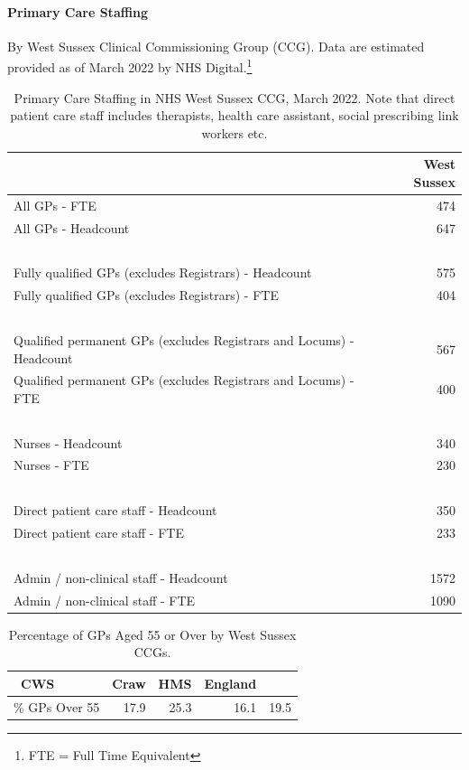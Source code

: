 \paragraph{Primary Care Staffing} By West Sussex Clinical Commissioning Group (CCG). Data are estimated provided as of March 2022 by NHS Digital.\footnote{FTE = Full Time Equivalent}
\begin{table}[hbt]
    \caption[Primary Care Staffing in NHS West Sussex CCG, March 2022.]{Primary Care Staffing in NHS West Sussex CCG, March 2022. Note that direct patient care staff includes therapists, health care assistant, social prescribing link workers etc.}
    \centering
    \begin{tabular}{lr}
    \toprule
    \ & West Sussex \\
    \midrule
    All GPs - FTE & 474 \\
    All GPs - Headcount & 647  \\
    \ & \ \\
    Fully qualified GPs (excludes Registrars) - Headcount & 575 \\
    Fully qualified GPs (excludes Registrars) - FTE & 404 \\
    \ & \ \\
    Qualified permanent GPs (excludes Registrars and Locums) - Headcount & 567  \\
    Qualified permanent GPs (excludes Registrars and Locums) - FTE & 400 \\
    \ & \ \\
    Nurses - Headcount & 340 \\
    Nurses - FTE & 230 \\
    \ & \ \\
    Direct patient care staff - Headcount & 350 \\
    Direct patient care staff - FTE & 233 \\
    \ & \ \\
    Admin / non-clinical staff - Headcount & 1572 \\
    Admin / non-clinical staff - FTE & 1090 \\
    \bottomrule
    \end{tabular}
    \label{tab:wa:primarystaff}
\end{table}

\begin{table}[hbt]
    \caption{Percentage of GPs Aged 55 or Over by West Sussex CCGs.}
    \centering
    \begin{tabular}{lrrrr}
    \toprule
    \ CWS & Craw & HMS & England \\
    \midrule
    \% GPs Over 55 & 17.9 & 25.3 & 16.1 & 19.5 \\
    \bottomrule
    \end{tabular}
    \label{tab:wa:primarystaff_o55}
\end{table}

